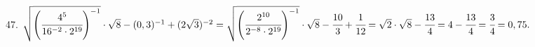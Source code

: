 47. $\sqrt{\left(\cfrac{4^5}{16^{-2}\cdot2^{19}}\right)^{-1}}\cdot\sqrt{8}-(0,3)^{-1}+(2\sqrt{3})^{-2}=
\sqrt{\left(\cfrac{2^{10}}{2^{-8}\cdot2^{19}}\right)^{-1}}\cdot\sqrt{8}-\cfrac{10}{3}+\cfrac{1}{12}=
\sqrt{2}\cdot\sqrt{8}-\cfrac{13}{4}=4-\cfrac{13}{4}=\cfrac{3}{4}=0,75.$\\
